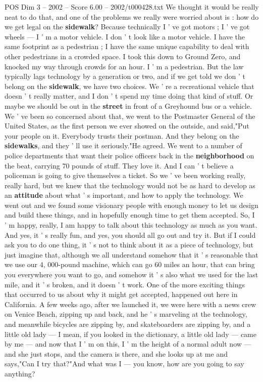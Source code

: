 \begin{textsample}{POS Dim 3 – 2002 – Score 6.00 – 2002/t000428.txt}
We thought it would be really neat to do that, and one of the problems we really were worried about is : how do we get legal on the \textbf{sidewalk}?
Because technically I ' ve got motors ; I ' ve got wheels — I ' m a motor vehicle.
I don ' t look like a motor vehicle.
I have the same footprint as a pedestrian ; I have the same unique capability to deal with other pedestrians in a crowded space.
I took this down to Ground Zero, and knocked my way through crowds for an hour.
I ' m a pedestrian.
But the law typically lags technology by a generation or two, and if we get told we don ' t belong on the \textbf{sidewalk}, we have two choices.
We ' re a recreational vehicle that doesn ' t really matter, and I don ' t spend my time doing that kind of stuff.
Or maybe we should be out in the \textbf{street} in front of a Greyhound bus or a vehicle.
We ' ve been so concerned about that, we went to the Postmaster General of the United States, as the first person we ever showed on the outside, and said,"Put your people on it.
Everybody trusts their postman.
And they belong on the \textbf{sidewalks}, and they ' ll use it seriously."He agreed.
We went to a number of police departments that want their police officers back in the \textbf{neighborhood} on the beat, carrying 70 pounds of stuff.
They love it.
And I can ' t believe a policeman is going to give themselves a ticket.
So we ' ve been working really, really hard, but we knew that the technology would not be as hard to develop as an \textbf{attitude} about what ' s important, and how to apply the technology.
We went out and we found some visionary people with enough money to let us design and build these things, and in hopefully enough time to get them accepted.
So, I ' m happy, really, I am happy to talk about this technology as much as you want.
And yes, it ' s really fun, and yes, you should all go out and try it.
But if I could ask you to do one thing, it ' s not to think about it as a piece of technology, but just imagine that, although we all understand somehow that it ' s reasonable that we use our 4, 000-pound machine, which can go 60 miles an hour, that can bring you everywhere you want to go, and somehow it ' s also what we used for the last mile, and it ' s broken, and it doesn ' t work.
One of the more exciting things that occurred to us about why it might get accepted, happened out here in California.
A few weeks ago, after we launched it, we were here with a news crew on Venice Beach, zipping up and back, and he ' s marveling at the technology, and meanwhile bicycles are zipping by, and skateboarders are zipping by, and a little old lady — I mean, if you looked in the dictionary, a little old lady — came by me — and now that I ' m on this, I ' m the height of a normal adult now — and she just stops, and the camera is there, and she looks up at me and says,"Can I try that?"And what was I — you know, how are you going to say anything?

\end{textsample}
